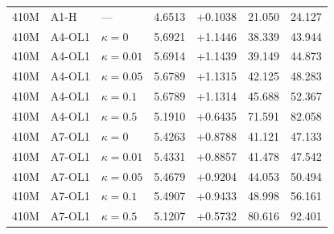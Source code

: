 \begin{table}[p]
\begin{tabular}{@{}lllrrrr@{}}
410M & A1-H & --- & 4.6513 & +0.1038 & 21.050 & 24.127 \\
410M & A4-OL1 & $\kappa=0$ & 5.6921 & +1.1446 & 38.339 & 43.944 \\
410M & A4-OL1 & $\kappa=0.01$ & 5.6914 & +1.1439 & 39.149 & 44.873 \\
410M & A4-OL1 & $\kappa=0.05$ & 5.6789 & +1.1315 & 42.125 & 48.283 \\
410M & A4-OL1 & $\kappa=0.1$ & 5.6789 & +1.1314 & 45.688 & 52.367 \\
410M & A4-OL1 & $\kappa=0.5$ & 5.1910 & +0.6435 & 71.591 & 82.058 \\
410M & A7-OL1 & $\kappa=0$ & 5.4263 & +0.8788 & 41.121 & 47.133 \\
410M & A7-OL1 & $\kappa=0.01$ & 5.4331 & +0.8857 & 41.478 & 47.542 \\
410M & A7-OL1 & $\kappa=0.05$ & 5.4679 & +0.9204 & 44.053 & 50.494 \\
410M & A7-OL1 & $\kappa=0.1$ & 5.4907 & +0.9433 & 48.998 & 56.161 \\
410M & A7-OL1 & $\kappa=0.5$ & 5.1207 & +0.5732 & 80.616 & 92.401 \\
\bottomrule
\end{tabular}
\end{table}
